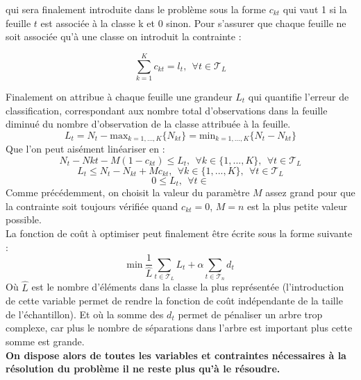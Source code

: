 \documentclass[12pt]{report}
\begin{document}
qui sera finalement introduite dans le problème sous la forme \(c_{kt}\) qui vaut 1 si la feuille \(t\) est associée à la classe k et 0 sinon. Pour s'assurer que chaque feuille ne soit associée qu'à une classe on introduit la contrainte :

\begin{equation}
    \sum_{k=1}^K c_{kt} =l_t, ~~ \forall t \in \mathcal{T}_L
\end{equation}

Finalement on attribue à chaque feuille une grandeur \(L_t\) qui quantifie l'erreur de classification, correspondant aux nombre total d'observations dans la feuille diminué du nombre d'observation de la classe attribuée à la feuille.
\begin{equation}
    L_t=N_t-\mbox{max}_{k=1,...,K}\{N_{kt}\}=\mbox{min}_{k=1,...,K}\{N_t-N_{kt}\}
\end{equation}
Que l'on peut aisément linéariser en :
\begin{equation}
    N_t-N{kt}-M(1-c_{kt}) \leq L_t, ~~ \forall k \in \{1,...,K\},~~\forall t \in \mathcal{T}_L
\end{equation}
\begin{equation}
    L_t \leq N_t-N_{kt}+Mc_{kt}, ~~ \forall k \in \{1,...,K\},~~\forall t \in \mathcal{T}_L
\end{equation}
\begin{equation}
    0 \leq L_t ,~~\forall t \in
\end{equation}
Comme précédemment, on choisit la valeur du paramètre \(M\) assez grand pour que la contrainte soit toujours vérifiée quand \(c_{kt}=0\), \(M=n\) est la plus petite valeur possible.\\

La fonction de coût à optimiser peut finalement être écrite sous la forme suivante :
\begin{equation}
    \mbox{min} ~ \frac{1}{\hat{L}}\sum_{t\in \mathcal{T}_L}L_t + \alpha \sum_{t\in \mathcal{T}_n} d_t
\end{equation}
Où \(\hat{L}\) est le nombre d'éléments dans la classe la plus représentée (l'introduction de cette variable permet de rendre la fonction de coût indépendante de la taille de l'échantillon). Et où la somme des \(d_t\) permet de pénaliser un arbre trop complexe, car plus le nombre de séparations dans l'arbre est important plus cette somme est grande.\\
\textbf{On dispose alors de toutes les variables et contraintes nécessaires à la résolution du problème il ne reste plus qu'à le résoudre.}
\end{document}
